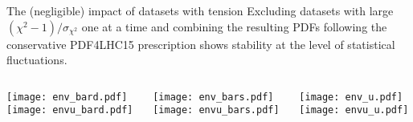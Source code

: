 \begin{frame}{The (negligible) impact of datasets with tension}
  Excluding datasets with large $({\chi^{2}-1})/{\sigma_{\chi^{2}}}$ one at a time and combining the resulting PDFs following the conservative PDF4LHC15 prescription shows stability at the level of statistical fluctuations.
  \begin{columns}
      \begin{column}[T]{0.32\textwidth}
          \centering
          \texttt{[image: env\_bard.pdf]}\\
          \texttt{[image: envu\_bard.pdf]}
      \end{column}
      \begin{column}[T]{0.32\textwidth}
          \centering
          \texttt{[image: env\_bars.pdf]}\\
          \texttt{[image: envu\_bars.pdf]}
      \end{column}
      \begin{column}[T]{0.32\textwidth}
          \centering
          \texttt{[image: env\_u.pdf]}\\
          \texttt{[image: envu\_u.pdf]}
      \end{column}
  \end{columns}
\end{frame}



